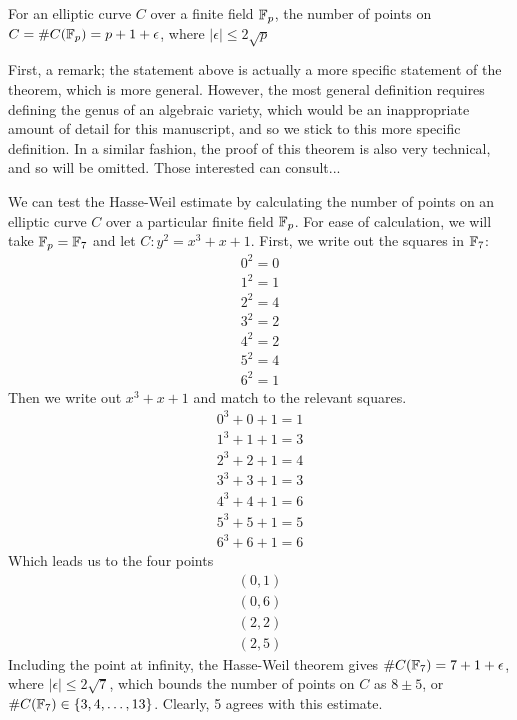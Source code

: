 
\begin{theorem}
For an elliptic curve $C$ over a finite field $\fp$, the number of points on $C = \#C(\fp) = p + 1 + \epsilon$, where $|\epsilon| \leq 2\sqrt{p}$
\end{theorem}
\begin{sproof}
	First, a remark; the statement above is actually a more specific statement of the theorem, which is more general. However, the most general definition requires defining the genus of an algebraic variety, which would be an inappropriate amount of detail for this manuscript, and so we stick to this more specific definition.
	In a similar fashion, the proof of this theorem is also very technical, and so will be omitted. Those interested can consult...
\end{sproof}
We can test the Hasse-Weil estimate by calculating the number of points on an elliptic curve $C$ over a particular finite field $\fp$. For ease of calculation, we will take $\fp = \fp[7]$ and let $C : y^2 = x^3 + x + 1$. First, we write out the squares in $\fp[7]$:
\begin{align*}
0^2 = 0\\
1^2 = 1\\
2^2 = 4\\
3^2 = 2\\
4^2 = 2\\
5^2 = 4\\
6^2 = 1
\end{align*}
Then we write out $x^3+x+1$ and match to the relevant squares.
\begin{align*}
0^3 + 0 + 1 = 1\\
1^3 + 1 + 1 = 3\\
2^3 + 2 + 1 = 4\\
3^3 + 3 + 1 = 3\\
4^3 + 4 + 1 = 6\\
5^3 + 5 + 1 = 5\\
6^3 + 6 + 1 = 6
\end{align*}
Which leads us to the four points
\begin{align*}
(0,1)\\
(0,6)\\
(2,2)\\
(2,5)
\end{align*}
Including the point at infinity, the Hasse-Weil theorem gives $\#C(\fp[7]) = 7 + 1 + \epsilon$, where $|\epsilon| \leq 2\sqrt{7}$, which bounds the number of points on $C$ as $8\pm5$, or $\#C(\fp[7]) \in \{3,4,\ldots,13\}$. Clearly, 5 %
agrees with this estimate.
